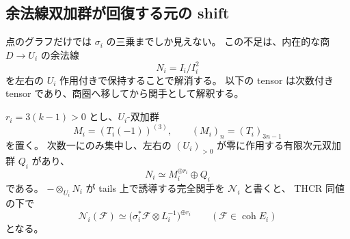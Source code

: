 \subsection{余法線双加群が回復する元の shift}

点のグラフだけでは $\sigma_i$ の三乗までしか見えない。
この不足は、内在的な商 $D\to U_i$ の余法線
\[
 N_i=I_i/I_i^2
\]
を左右の $U_i$ 作用付きで保持することで解消する。
以下の tensor は次数付き tensor であり、商圏へ移してから関手として解釈する。

\begin{proposition}
\label{mbiq:prop:conormal-root}
$r_i=3(k-1)>0$ とし、$U_i$-双加群
\[
 M_i=(T_i(-1))^{(3)},\qquad (M_i)_n=(T_i)_{3n-1}
\]
を置く。
次数一にのみ集中し、左右の $(U_i)_{>0}$ が零に作用する有限次元双加群 $Q_i$ があり、
\begin{equation}\label{mbiq:eq:conormal}
 N_i\simeq M_i^{\oplus r_i}\oplus Q_i
\end{equation}
である。
$-\otimes_{U_i}N_i$ が tails 上で誘導する完全関手を $\mathcal N_i$ と書くと、
THCR 同値の下で
\begin{equation}\label{mbiq:eq:conormal-functor}
 \mathcal N_i(\mathcal F)
 \simeq\bigl(\sigma_i^*\mathcal F\otimes L_i^{-1}\bigr)^{\oplus r_i}
 \qquad(\mathcal F\in\operatorname{coh}E_i)
\end{equation}
となる。
\end{proposition}
